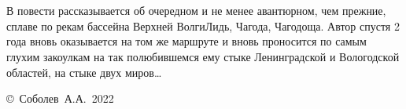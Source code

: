 \chapter*{}

В повести рассказывается об очередном и не менее авантюрном, чем прежние, сплаве по рекам бассейна Верхней Волги\mdash Лидь, Чагода, Чагодоща. Автор спустя 2 года вновь оказывается на том же маршруте и вновь проносится по самым глухим закоулкам на так полюбившемся ему стыке Ленинградской и Вологодской областей, на стыке двух миров\ldots 

\vspace{\fill}
\begin{flushright}
	\copyright~Соболев~А.А.~2022
\end{flushright}